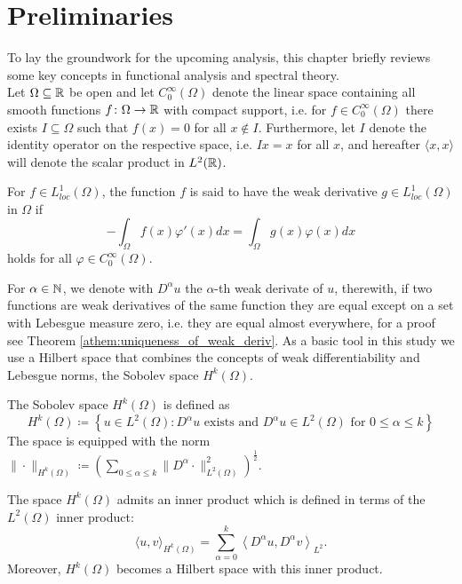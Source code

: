 \chapter{Preliminaries} \label{chap:2}

To lay the groundwork for the upcoming analysis, this chapter briefly reviews some key concepts in functional analysis and spectral theory.
~\\

Let $\Omega \subseteq \mathbb{R}$ be open and let $C_{0}^{\infty}(\Omega)$ denote the linear space containing all smooth functions $f \colon \Omega \rightarrow \mathbb{R}$ with compact support, i.e. for $f \in C_{0}^{\infty}(\Omega)$ there exists $I \subseteq \Omega$ such that $f(x) = 0$ for all $x \notin I$. Furthermore, let $I$ denote the identity operator on the respective space, i.e. $I x = x$ for all $x$, and hereafter $\langle x, x \rangle$ will denote the scalar product in $L^{2}(\mathbb{R})$.
\begin{definition}
For $f \in L^{1}_{loc}(\Omega)$, the function $f$ is said to have the weak derivative $g \in L^{1}_{loc}(\Omega)$ in $\Omega$ if
  \[ - \int_{\Omega} f(x) \varphi'(x) dx = \int_{\Omega} g(x) \varphi(x) dx \]
holds for all $\varphi \in C_{0}^{\infty}(\Omega)$.
\end{definition}
For $\alpha \in \mathbb{N}$, we denote with $D^{\alpha} u$ the $\alpha$-th weak derivate of $u$, therewith, if two functions are weak derivatives of the same function they are equal except on a set with Lebesgue measure zero, i.e. they are equal almost everywhere, for a proof see Theorem \ref{athem:uniqueness_of_weak_deriv}. As a basic tool in this study we use a Hilbert space that combines the concepts of weak differentiability and Lebesgue norms, the Sobolev space $H^{k}(\Omega)$.

\begin{definition} The Sobolev space $H^{k}(\Omega)$ is defined as
\[ H^{k}(\Omega) \coloneqq \left\{ u \in L^{2}(\Omega) : D^{\alpha} u \text{ exists and } D^{\alpha} u \in L^{2}(\Omega) \text{ for } 0 \leq \alpha \leq k \right\} \]
The space is equipped with the norm $\| \cdot \|_{H^{k}(\Omega)} \coloneqq \left( \sum_{0 \leq \alpha \leq k} \| D^{\alpha} \cdot \|_{L^{2}(\Omega)}^{2} \right)^{\frac{1}{2}}$.
\end{definition}	

The space $H^{k}(\Omega)$ admits an inner product which is defined in terms of the $L^{2}(\Omega)$ inner product:
	\[  \langle u,v \rangle_{H^{k}(\Omega)} = \sum_{\alpha=0}^{k} \left\langle D^{\alpha} u, D^{\alpha} v \right \rangle_{L^2}. \]
Moreover, $H^{k}(\Omega)$ becomes a Hilbert space with this inner product.

